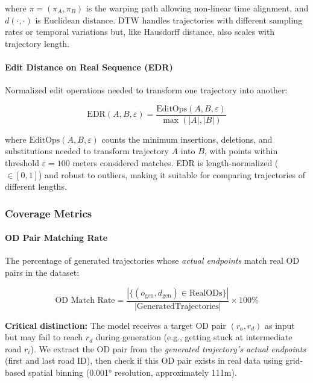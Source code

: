 where $\pi = (\pi_A, \pi_B)$ is the warping path allowing non-linear time alignment, and $d(\cdot, \cdot)$ is Euclidean distance. DTW handles trajectories with different sampling rates or temporal variations but, like Hausdorff distance, also scales with trajectory length.

\paragraph{Edit Distance on Real Sequence (EDR)}

Normalized edit operations needed to transform one trajectory into another:

\begin{equation}
    \text{EDR}(A, B, \varepsilon) = \frac{\text{EditOps}(A, B, \varepsilon)}{\max(|A|, |B|)}
    \label{eq:edr-appendix}
\end{equation}

where $\text{EditOps}(A, B, \varepsilon)$ counts the minimum insertions, deletions, and substitutions needed to transform trajectory $A$ into $B$, with points within threshold $\varepsilon = 100$ meters considered matches. EDR is length-normalized ($\in [0,1]$) and robust to outliers, making it suitable for comparing trajectories of different lengths.

\subsubsection{Coverage Metrics}
\label{app:coverage-metrics}

\paragraph{OD Pair Matching Rate}

The percentage of generated trajectories whose \emph{actual endpoints} match real OD pairs in the dataset:

\begin{equation}
    \text{OD Match Rate} = \frac{|\{(o_{\text{gen}}, d_{\text{gen}}) \in \text{RealODs}\}|}{|\text{GeneratedTrajectories}|} \times 100\%
    \label{eq:od-match-appendix}
\end{equation}

\textbf{Critical distinction:} The model receives a target OD pair $(r_o, r_d)$ as input but may fail to reach $r_d$ during generation (e.g., getting stuck at intermediate road $r_i$). We extract the OD pair from the \emph{generated trajectory's actual endpoints} (first and last road ID), then check if this OD pair exists in real data using grid-based spatial binning (0.001° resolution, approximately 111m).

